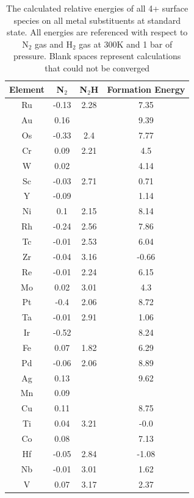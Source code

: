 \documentclass{article}
\begin{document}
\begin{table}
\begin{center}
\begin{tabular}{| c | c | c | c |}
\hline
Element & N$_2$ & N$_2$H & Formation Energy \\
\hline
Ru & -0.13 & 2.28 & 7.35 \\
Au & 0.16 &  & 9.39 \\
Os & -0.33 & 2.4 & 7.77 \\
Cr & 0.09 & 2.21 & 4.5 \\
W & 0.02 &  & 4.14 \\
Sc & -0.03 & 2.71 & 0.71 \\
Y & -0.09 &  & 1.14 \\
Ni & 0.1 & 2.15 & 8.14 \\
Rh & -0.24 & 2.56 & 7.86 \\
Tc & -0.01 & 2.53 & 6.04 \\
Zr & -0.04 & 3.16 & -0.66 \\
Re & -0.01 & 2.24 & 6.15 \\
Mo & 0.02 & 3.01 & 4.3 \\
Pt & -0.4 & 2.06 & 8.72 \\
Ta & -0.01 & 2.91 & 1.06 \\
Ir & -0.52 &  & 8.24 \\
Fe & 0.07 & 1.82 & 6.29 \\
Pd & -0.06 & 2.06 & 8.89 \\
Ag & 0.13 &  & 9.62 \\
Mn & 0.09 &  &  \\
Cu & 0.11 &  & 8.75 \\
Ti & 0.04 & 3.21 & -0.0 \\
Co & 0.08 &  & 7.13 \\
Hf & -0.05 & 2.84 & -1.08 \\
Nb & -0.01 & 3.01 & 1.62 \\
V & 0.07 & 3.17 & 2.37 \\
\hline
\end{tabular}
\end{center}
\label{table:4+_energies}
\caption{The calculated relative energies of all 4+ surface species on all metal substituents at standard state. All energies are referenced with respect to N$_2$ gas and H$_2$ gas at 300K and 1 bar of pressure. Blank spaces represent calculations that could not be converged}
\end{table}
\end{document}
